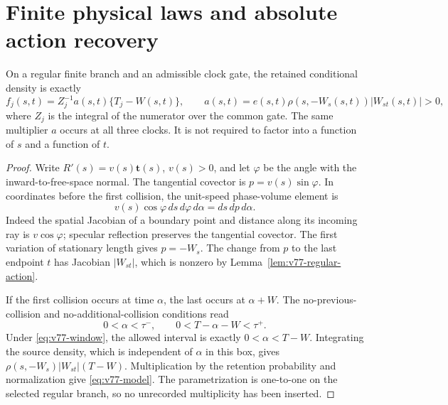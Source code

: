 \section{Finite physical laws and absolute action recovery}
\label{sec:v77-clocks}

\begin{lemma}
\label{lem:v77-physical}
On a regular finite branch and an admissible clock gate, the retained
conditional density is exactly
\begin{equation}\label{eq:v77-model}
 f_j(s,t)=Z_j^{-1}a(s,t)\{T_j-W(s,t)\},\qquad
 a(s,t)=e(s,t)\rho(s,-W_s(s,t))|W_{st}(s,t)|>0,
\end{equation}
where $Z_j$ is the integral of the numerator over the common gate.
The same multiplier $a$ occurs at all three clocks.  It is not required
to factor into a function of $s$ and a function of $t$.
\end{lemma}
\begin{proof}
Write $R'(s)=v(s)\mathbf t(s)$, $v(s)>0$, and let $\varphi$ be the
angle with the inward-to-free-space normal.  The tangential covector is
$p=v(s)\sin\varphi$.  In coordinates before the first collision, the
unit-speed phase-volume element is
\[
 v(s)\cos\varphi\,ds\,d\varphi\,d\alpha=ds\,dp\,d\alpha.
\]
Indeed the spatial Jacobian of a boundary point and distance along its
incoming ray is $v\cos\varphi$; specular reflection preserves the
tangential covector.  The first variation of stationary length gives
$p=-W_s$.  The change from $p$ to the last endpoint $t$ has Jacobian
$|W_{st}|$, which is nonzero by Lemma~\ref{lem:v77-regular-action}.

If the first collision occurs at time $\alpha$, the last occurs at
$\alpha+W$.  The no-previous-collision and no-additional-collision
conditions read
\[
 0<\alpha<\tau^-,\qquad 0<T-\alpha-W<\tau^+.
\]
Under \eqref{eq:v77-window}, the allowed interval is exactly
$0<\alpha<T-W$.  Integrating the source density, which is independent
of $\alpha$ in this box, gives $\rho(s,-W_s)|W_{st}|(T-W)$.
Multiplication by the retention probability and normalization give
\eqref{eq:v77-model}.  The parametrization is one-to-one on the selected
regular branch, so no unrecorded multiplicity has been inserted.
\end{proof}

